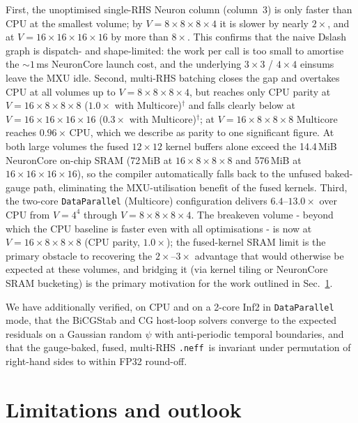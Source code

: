 \documentclass[a4paper,11pt]{article}
\newcommand{\NEFF}{\texttt{.neff}}
\begin{document}
First, the unoptimised single-RHS Neuron column (column~3) is only
faster than CPU at the smallest volume; by $V=8{\times}8{\times}8{\times}4$ it is
slower by nearly $2\times$, and at $V=16{\times}16{\times}16{\times}16$ by more
than $8\times$. This confirms that the naive Dslash graph is
dispatch- and shape-limited: the work per call is too small to
amortise the $\sim\!1\,$ms NeuronCore launch cost, and the
underlying $3{\times}3$ / $4{\times}4$ einsums leave the MXU idle.
Second, multi-RHS batching closes the gap and overtakes CPU at all
volumes up to $V=8{\times}8{\times}8{\times}4$, but reaches only CPU parity at
$V=16{\times}8{\times}8{\times}8$ ($1.0\times$ with Multicore)$^\dagger$ and falls
clearly below at $V=16{\times}16{\times}16{\times}16$ ($0.3\times$ with Multicore)$^\dagger$;
at $V=16{\times}8{\times}8{\times}8$ Multicore reaches $0.96\times$\,CPU,
which we describe as parity to one significant figure.
At both large volumes the fused $12{\times}12$ kernel buffers alone
exceed the 14.4\,MiB NeuronCore on-chip SRAM (72\,MiB at
$16{\times}8{\times}8{\times}8$ and 576\,MiB at $16{\times}16{\times}16{\times}16$), so the
compiler automatically falls back to the unfused baked-gauge path,
eliminating the MXU-utilisation benefit of the fused kernels.
Third, the two-core \texttt{DataParallel} (Multicore) configuration
delivers $6.4$--$13.0\times$ over CPU from $V=4^4$ through
$V=8{\times}8{\times}8{\times}4$. The breakeven volume - beyond which the
CPU baseline is faster even with all optimisations - is now at
$V=16{\times}8{\times}8{\times}8$ (CPU parity, $1.0\times$); the fused-kernel
SRAM limit is the primary obstacle to recovering the $2\times$--$3\times$
advantage that would otherwise be expected at these volumes, and
bridging it (via kernel tiling or NeuronCore SRAM bucketing) is the
primary motivation for the work outlined in Sec.~\ref{sec:outlook}.

We have additionally verified, on CPU and on a 2-core Inf2 in
\texttt{DataParallel} mode, that the BiCGStab and CG host-loop
solvers converge to the expected residuals on a Gaussian random
$\psi$ with anti-periodic temporal boundaries, and that the
gauge-baked, fused, multi-RHS \NEFF\ is invariant under permutation
of right-hand sides to within FP32 round-off.

\section{Limitations and outlook}
\label{sec:outlook}
\end{document}
